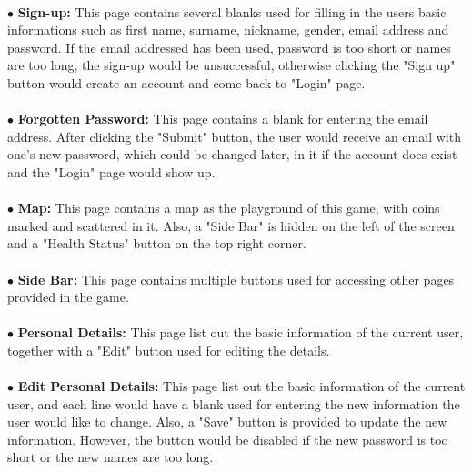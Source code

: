 \documentclass[paper=a4, fontsize=11pt]{scrartcl} %
\begin{document}
\paragraph{}$\bullet$ \textbf{Sign-up: } This page contains several blanks used for filling in the users basic informations such as first name, surname, nickname, gender, email address and password. If the email addressed has been used, password is too short or names are too long, the sign-up would be unsuccessful, otherwise clicking the "Sign up" button would create an account and come back to "Login" page.
\paragraph{}$\bullet$ \textbf{Forgotten Password: } This page contains a blank for entering the email address. After clicking the "Submit" button, the user would receive an email with one's new password, which could be changed later, in it if the account does exist and the "Login" page would show up. 
\paragraph{}$\bullet$ \textbf{Map: } This page contains a map as the playground of this game, with coins marked and scattered in it. Also, a "Side Bar" is hidden on the left of the screen and a "Health Status" button on the top right corner.
\paragraph{}$\bullet$ \textbf{Side Bar: } This page contains multiple buttons used for accessing other pages provided in the game.
\paragraph{}$\bullet$ \textbf{Personal Details: } This page list out the basic information of the current user, together with a "Edit" button used for editing the details.
\paragraph{}$\bullet$ \textbf{Edit Personal Details: } This page list out the basic information of the current user, and each line would have a blank used for entering the new information the user would like to change. Also, a "Save" button is provided to update the new information. However, the button would be disabled if the new password is too short or the new names are too long.
\end{document}
